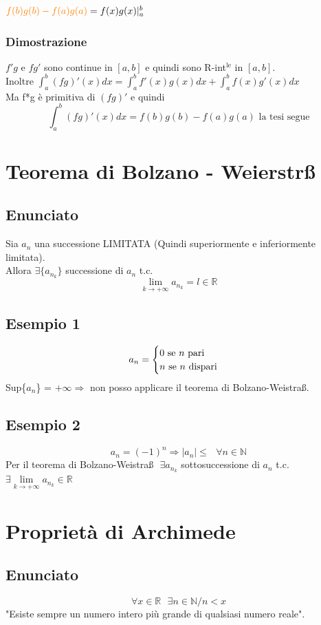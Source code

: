 \documentclass{article}
\newcommand{\R}{\mathbb{R}}
\newcommand{\N}{\mathbb{N}}
\begin{document}
\begin{flushleft}
$\textcolor{orange}{ f(b)g(b) - f(a)g(a)} = f(x)g(x)|_{a}^{b}$

\subsubsection{Dimostrazione}
$f'g$ e $fg'$ sono continue in $[a,b]$ e quindi sono R-int$^\text{le}$ in $[a,b]$.\\
Inoltre $\int_{a}^{b}(fg)'(x)dx = \int_{a}^{b}f'(x)g(x)dx + \int_{a}^{b}f(x)g'(x)dx$\\
Ma  f*g è primitiva di  $(fg)'$ e quindi
\[
    \int_{a}^{b}(fg)'(x)dx = f(b)g(b) - f(a)g(a) \text{ la tesi segue}
\]


\section{Teorema di Bolzano - Weierstr\ss}
\subsection{Enunciato}
Sia ${a_n}$ una successione LIMITATA (Quindi superiormente e inferiormente limitata).\\
Allora $\exists \{ a_{n_k} \}$ successione di $a_n$ t.c. 
\[\lim\limits_{k \to + \infty } a_{n_k} = l \in \R\]

\subsection{Esempio 1}
\[
    a_n  =
    \begin{cases}
        0 $ se $ n $ pari$\\
        n $ se $ n $ dispari$
    \end{cases}
\]
Sup\{$a_n$\} = $+ \infty \Rightarrow$ non posso applicare il teorema di Bolzano-Weistra\ss.

\subsection{Esempio 2}
\[
    a_n = (-1)^n \Rightarrow \left|a_n\right| \leq \text{ } \forall n \in \N
\]
Per il teorema di Bolzano-Weistra\ss $ \text{ } \exists a_{n_k}$ sottosuccessione di $a_n$ t.c. $\exists \lim\limits_{k \to + \infty} a_{n_k} \in \R$

\section{Proprietà di Archimede} \label{Archimede}
\subsection{Enunciato}
\[ \forall x \in \R \text{ } \exists n \in \N / n < x \]
"Esiste sempre un numero intero più grande di qualsiasi numero reale".

\end{flushleft}
\end{document}
